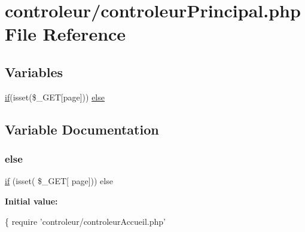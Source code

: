 \hypertarget{controleur_principal_8php}{}\section{controleur/controleur\+Principal.php File Reference}
\label{controleur_principal_8php}
\subsection*{Variables}
\begin{DoxyCompactItemize}
\item 
\hyperlink{controleur_create_phone_8php_ae87c4f53487f23ee9a965a6691be21d2}{if}(isset(\$\+\_\+\+G\+ET\mbox{[}\textquotesingle{}page\textquotesingle{}\mbox{]})) \hyperlink{controleur_principal_8php_ad62ee00be26b88cd6e684e36830cda53}{else}
\end{DoxyCompactItemize}


\subsection{Variable Documentation}
\mbox{\label{controleur_principal_8php_ad62ee00be26b88cd6e684e36830cda53}} 
\subsubsection{\texorpdfstring{else}{else}}
{\footnotesize\ttfamily \hyperlink{controleur_create_phone_8php_ae87c4f53487f23ee9a965a6691be21d2}{if} (isset( \$\+\_\+\+G\+ET\mbox{[} \textquotesingle{}page\textquotesingle{}\mbox{]})) else}

{\bfseries Initial value\+:}
\begin{DoxyCode}
\{
      require \textcolor{stringliteral}{'controleur/controleurAccueil.php'}
\end{DoxyCode}
